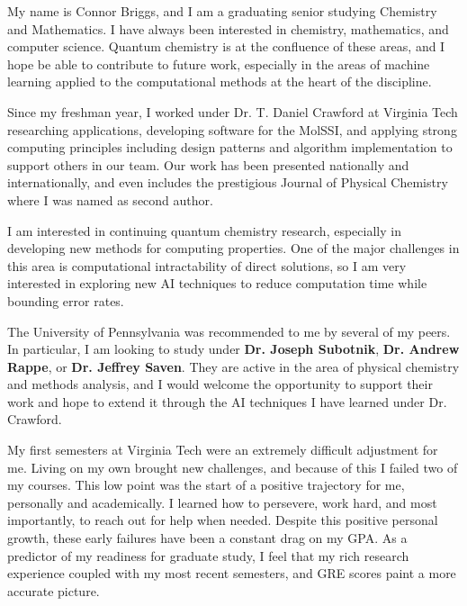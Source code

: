 \documentclass[12pt]{article}
\begin{document}
\noindent My name is Connor Briggs, and I am a graduating senior studying Chemistry and Mathematics.  I have always been interested in chemistry, mathematics, and computer science.  Quantum chemistry is at the confluence of these areas, and I hope be able to contribute to future work, especially in the areas of machine learning applied to the computational methods at the heart of the discipline.

Since my freshman year, I worked under Dr. T. Daniel Crawford at Virginia Tech researching applications, developing software for the MolSSI, and applying strong computing principles including design patterns and algorithm implementation to support others in our team.  Our work has been presented nationally and internationally, and even includes the prestigious Journal of Physical Chemistry where I was named as second author.

I am interested in continuing quantum chemistry research, especially in developing new methods for computing properties.  One of the major challenges in this area is computational intractability of direct solutions, so I am very interested in exploring new AI techniques to reduce computation time while bounding error rates.

The University of Pennsylvania was recommended to me by several of my peers.  In particular, I am looking to study under \textbf{Dr. Joseph Subotnik}, \textbf{Dr. Andrew Rappe}, or \textbf{Dr. Jeffrey Saven}. They are active in the area of physical chemistry and methods analysis, and I would welcome the opportunity to support their work and hope to extend it through the AI techniques I have learned under Dr. Crawford.

My first semesters at Virginia Tech were an extremely difficult adjustment for me.  Living on my own brought new challenges, and because of this I failed two of my courses.  This low point was the start of a positive trajectory for me, personally and academically.  I learned how to persevere, work hard, and most importantly, to reach out for help when needed.  Despite this positive personal growth, these early failures have been a constant drag on my GPA. As a predictor of my readiness for graduate study, I feel that my rich research experience coupled with my most recent semesters, and GRE scores paint a more accurate picture.
\end{document}
